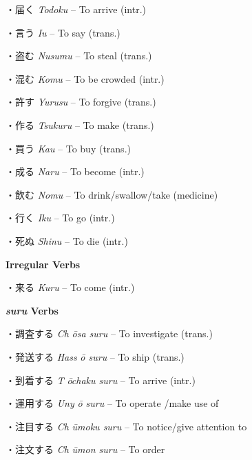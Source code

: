 \par{・届く \emph{Todoku }– To arrive (intr.) }

\par{・言う \emph{Iu }– To say (trans.) }

\par{・盗む \emph{Nusumu }– To steal (trans.) }

\par{・混む \emph{Komu }– To be crowded (intr.) }

\par{・許す \emph{Yurusu }– To forgive (trans.) }

\par{・作る \emph{Tsukuru }– To make (trans.) }

\par{・買う \emph{Kau }– To buy (trans.) }

\par{・成る \emph{Naru }– To become (intr.) }

\par{・飲む \emph{Nomu }– To drink\slash swallow\slash take (medicine) }

\par{・行く \emph{Iku }– To go (intr.) }

\par{・死ぬ \emph{Shinu }– To die (intr.) }

\par{\textbf{Irregular Verbs }}

\par{・来る \emph{Kuru }– To come (intr.) }

\par{\textbf{\emph{suru }Verbs }}

\par{・調査する \emph{Ch }\emph{ōsa suru }– To investigate (trans.) }

\par{・発送する \emph{Hass }\emph{ō suru }– To ship (trans.) }

\par{・到着する \emph{T }\emph{ōchaku suru }– To arrive (intr.) }

\par{・運用する \emph{Un\textquotesingle y }\emph{ō suru }– To operate \slash make use of }

\par{・注目する \emph{Ch }\emph{ūmoku suru }– To notice\slash give attention to }

\par{・注文する \emph{Ch }\emph{ūmon suru }– To order }

